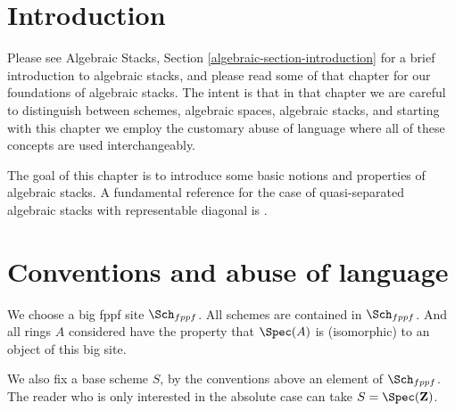\section{Introduction}
\label{stacks-properties-section-introduction}
Please see
Algebraic Stacks, Section \ref{algebraic-section-introduction}
for a brief introduction to algebraic stacks, and please read
some of that chapter for our foundations of algebraic stacks.
The intent is that in that chapter we are careful to distinguish
between schemes, algebraic spaces, algebraic stacks, and starting
with this chapter we employ the customary abuse of language where
all of these concepts are used interchangeably.

\medskip\noindent
The goal of this chapter is to introduce some basic notions and
properties of algebraic stacks. A fundamental
reference for the case of quasi-separated algebraic stacks with representable
diagonal is \cite{LM-B}.

\section{Conventions and abuse of language}
\label{stacks-properties-section-conventions}
We choose a big fppf site $\Sch_{fppf}$.
All schemes are contained in $\Sch_{fppf}$.
And all rings $A$ considered have the property that
$\Spec(A)$ is (isomorphic) to an object of this big site.

\medskip\noindent
We also fix a base scheme $S$, by the conventions above an element
of $\Sch_{fppf}$. The reader who is only interested
in the absolute case can take $S = \Spec(\mathbf{Z})$.


